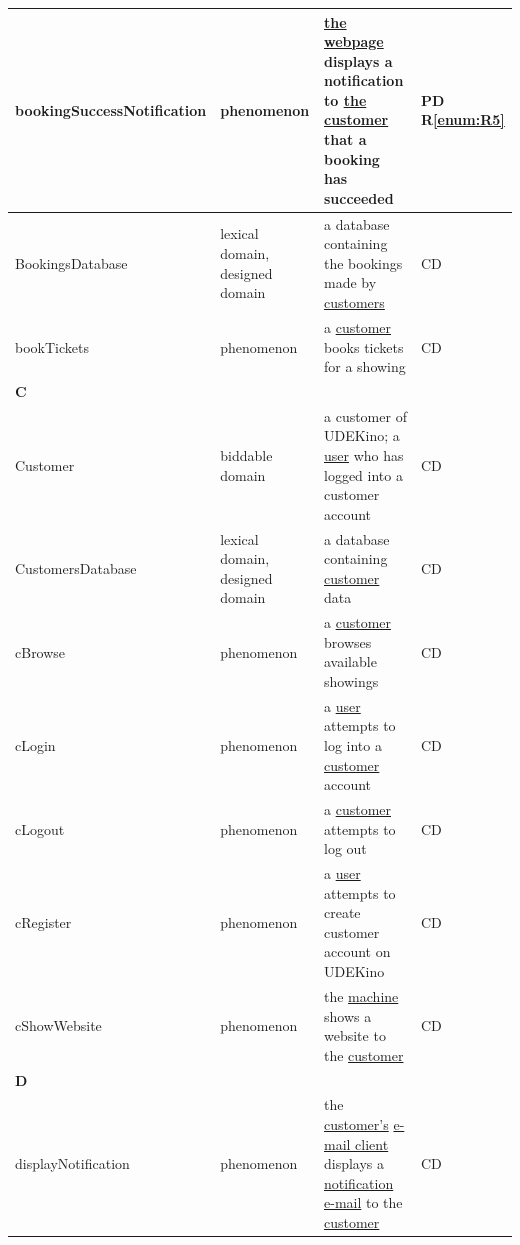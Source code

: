 \documentclass[a4paper,10pt,titlepage,bibtotoc,bibtotocnumbered]{scrreprt}
\begin{document}
\begin{longtable}{|l|p{3cm}|p{5cm}|l|}
\hline
\hypertarget{glossary:bookingSuccessNotification}{bookingSuccessNotification} & phenomenon & \hyperlink{glossary:WebpageBookTickets}{the webpage} displays a notification to \hyperlink{glossary:Customer}{the customer} that a booking has succeeded & PD R\ref{enum:R5}\\
\hline
\hypertarget{glossary:BookingsDatabase}{BookingsDatabase} & lexical domain, designed domain & a database containing the bookings made by \hyperlink{glossary:Customer}{customers} & CD\\
\hline
\hypertarget{glossary:bookTickets}{bookTickets} & phenomenon & a \hyperlink{glossary:Customer}{customer} books tickets for a showing & CD\\
\hline
\multicolumn{4}{|l|}{\textbf{C}}\\
\hline
\hypertarget{glossary:Customer}{Customer} & biddable domain & a customer of UDEKino; a \hyperlink{glossary:User}{user} who has logged into a customer account & CD\\
\hline
\hypertarget{glossary:CustomersDatabase}{CustomersDatabase} & lexical domain, designed domain & a database containing \hyperlink{glossary:Customer}{customer} data & CD\\
\hline
\hypertarget{glossary:cBrowse}{cBrowse} & phenomenon & a \hyperlink{glossary:Customer}{customer} browses available showings & CD\\
\hline
\hypertarget{glossary:cLogin}{cLogin} & phenomenon & a \hyperlink{glossary:User}{user} attempts to log into a \hyperlink{glossary:Customer}{customer} account & CD\\
\hline
\hypertarget{glossary:cLogout}{cLogout} & phenomenon & a \hyperlink{glossary:Customer}{customer} attempts to log out & CD\\
\hline
\hypertarget{glossary:cRegister}{cRegister} & phenomenon & a \hyperlink{glossary:User}{user} attempts to create customer account on UDEKino & CD\\
\hline
\hypertarget{glossary:cShowWebsite}{cShowWebsite} & phenomenon & the \hyperlink{glossary:UDEKino}{machine} shows a website to the \hyperlink{glossary:Customer}{customer} & CD\\
\hline
\multicolumn{4}{|l|}{\textbf{D}}\\
\hline
\hypertarget{glossary:displayNotification}{displayNotification} & phenomenon & the \hyperlink{glossary:Customer}{customer's} \hyperlink{glossary:Email}{e-mail client} displays a \hyperlink{glossary:notifyCustomer}{notification e-mail} to the \hyperlink{glossary:Customer}{customer} & CD\\

\end{longtable}
\end{document}
